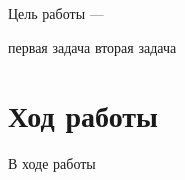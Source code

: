 \documentclass[a4paper,14pt]{extarticle}
\begin{document}
\maketitle
\suaitoc

\suaiintro

Цель работы —

\suaitasks
первая задача
вторая задача

\section{Ход работы}



\suaiconclusion

В ходе работы
\end{document}
